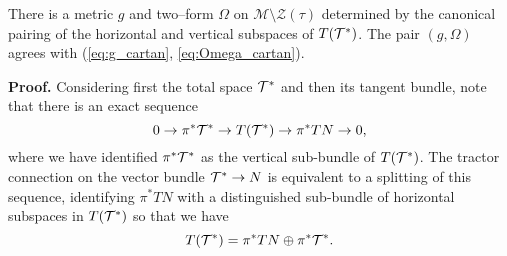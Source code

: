 \begin{theo}\cite{DGW}\label{metric} 
There is a metric $g$ and two--form $\Omega$ on $\mathcal{M}\setminus \mathcal{Z}(\tau)$ determined by the canonical pairing of the horizontal and vertical subspaces of $T(\mathcal{T}^*)$. The pair $(g,\Omega)$ agrees with (\ref{eq:g_cartan}, \ref{eq:Omega_cartan}).
\end{theo}
{\bf Proof.}
 Considering first the total space $\mathcal{T}^*$ and then its tangent
 bundle, note that there is an exact sequence
  \begin{equation}\label{TM}
0\to \pi^* \mathcal{T}^*\to T(\mathcal{T}^*)\to \pi^*TN\to 0,
  \end{equation}
  where we have identified $\pi^* \mathcal{T}^*$ as the vertical sub-bundle of $T(\mathcal{T}^*)$.
The tractor connection on the vector bundle $\mathcal{T}^*\to N$ is equivalent to a splitting of this sequence, identifying $\pi^*TN$ with a distinguished  sub-bundle of horizontal subspaces in 
$ T(\mathcal{T}^*)$ so that we have 
\begin{equation}\label{HV}
T(\mathcal{T}^*)=  \pi^*TN\oplus \pi^* \mathcal{T}^* .
\end{equation}

